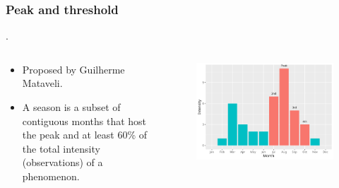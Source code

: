 \documentclass[aspectratio=169]{beamer}
\begin{document}
\begin{frame}
    \frametitle{Peak and threshold}.
    \begin{columns}
        \begin{column}{0.5\linewidth}
            \begin{itemize}
                \item Proposed by Guilherme Mataveli.
                \item A season is a subset of contiguous months that host the
                    peak and at least 60\% of the total intensity
                    (observations) of a phenomenon.
            \end{itemize}
        \end{column}
        \begin{column}{0.5\linewidth}
            \begin{figure}[h]
                \includegraphics[width=0.99\linewidth]
                {./images/peak_thres_hist.png}
            \end{figure}
        \end{column}
    \end{columns}
\end{frame}
\end{document}
